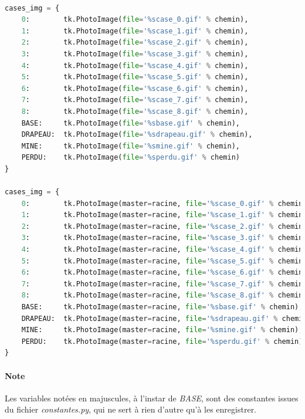 \documentclass[12pt, a4paper]{article}
\begin{document}
\paragraph{}
\begin{lstlisting}[language=Python, caption=Version 1 de \emph{cases\_img}]
cases_img = {
    0:        tk.PhotoImage(file='%scase_0.gif' % chemin),
    1:        tk.PhotoImage(file='%scase_1.gif' % chemin),
    2:        tk.PhotoImage(file='%scase_2.gif' % chemin),
    3:        tk.PhotoImage(file='%scase_3.gif' % chemin),
    4:        tk.PhotoImage(file='%scase_4.gif' % chemin),
    5:        tk.PhotoImage(file='%scase_5.gif' % chemin),
    6:        tk.PhotoImage(file='%scase_6.gif' % chemin),
    7:        tk.PhotoImage(file='%scase_7.gif' % chemin),
    8:        tk.PhotoImage(file='%scase_8.gif' % chemin),
    BASE:     tk.PhotoImage(file='%sbase.gif' % chemin),
    DRAPEAU:  tk.PhotoImage(file='%sdrapeau.gif' % chemin),
    MINE:     tk.PhotoImage(file='%smine.gif' % chemin),
    PERDU:    tk.PhotoImage(file='%sperdu.gif' % chemin)
}
\end{lstlisting}

\paragraph{}
\begin{lstlisting}[language=Python, caption=Version finale de \emph{cases\_img}]
cases_img = {
    0:        tk.PhotoImage(master=racine, file='%scase_0.gif' % chemin),
    1:        tk.PhotoImage(master=racine, file='%scase_1.gif' % chemin),
    2:        tk.PhotoImage(master=racine, file='%scase_2.gif' % chemin),
    3:        tk.PhotoImage(master=racine, file='%scase_3.gif' % chemin),
    4:        tk.PhotoImage(master=racine, file='%scase_4.gif' % chemin),
    5:        tk.PhotoImage(master=racine, file='%scase_5.gif' % chemin),
    6:        tk.PhotoImage(master=racine, file='%scase_6.gif' % chemin),
    7:        tk.PhotoImage(master=racine, file='%scase_7.gif' % chemin),
    8:        tk.PhotoImage(master=racine, file='%scase_8.gif' % chemin),
    BASE:     tk.PhotoImage(master=racine, file='%sbase.gif' % chemin),
    DRAPEAU:  tk.PhotoImage(master=racine, file='%sdrapeau.gif' % chemin),
    MINE:     tk.PhotoImage(master=racine, file='%smine.gif' % chemin),
    PERDU:    tk.PhotoImage(master=racine, file='%sperdu.gif' % chemin)
}
\end{lstlisting}

\paragraph{Note}
Les variables notées en majuscules, à l'instar de \emph{BASE}, sont des
constantes issues du fichier \emph{constantes.py}, qui ne sert à rien d'autre
qu'à les enregistrer.
\end{document}
